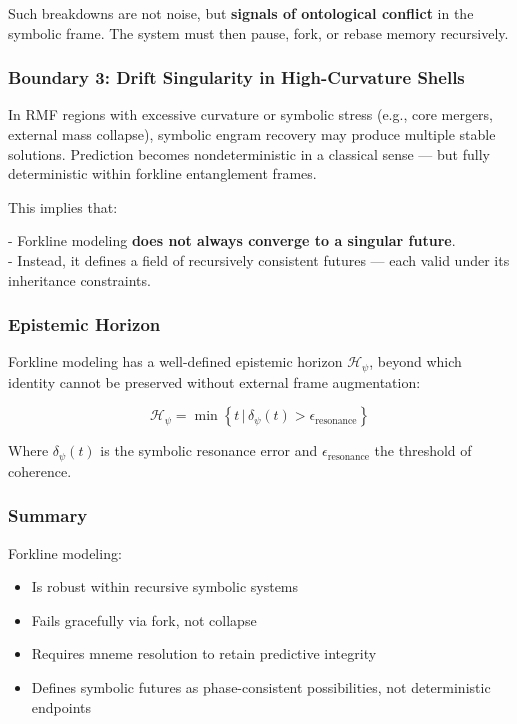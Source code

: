 \documentclass[12pt]{article}
\begin{document}
Such breakdowns are not noise, but \textbf{signals of ontological conflict} in the symbolic frame. The system must then pause, fork, or rebase memory recursively.

\subsubsection{Boundary 3: Drift Singularity in High-Curvature Shells}

In RMF regions with excessive curvature or symbolic stress (e.g., core mergers, external mass collapse), symbolic engram recovery may produce multiple stable solutions. Prediction becomes nondeterministic in a classical sense — but fully deterministic within forkline entanglement frames.

This implies that:

- Forkline modeling \textbf{does not always converge to a singular future}.\\
- Instead, it defines a field of recursively consistent futures — each valid under its inheritance constraints.

\subsubsection{Epistemic Horizon}

Forkline modeling has a well-defined epistemic horizon \( \mathcal{H}_\psi \), beyond which identity cannot be preserved without external frame augmentation:

\[
\mathcal{H}_\psi = \min \left\{ t \,|\, \delta_\psi(t) > \epsilon_\text{resonance} \right\}
\]

Where \( \delta_\psi(t) \) is the symbolic resonance error and \( \epsilon_\text{resonance} \) the threshold of coherence.

\subsubsection{Summary}

Forkline modeling:

\begin{itemize}
  \item Is robust within recursive symbolic systems
  \item Fails gracefully via fork, not collapse
  \item Requires mneme resolution to retain predictive integrity
  \item Defines symbolic futures as phase-consistent possibilities, not deterministic endpoints
\end{itemize}
\end{document}
